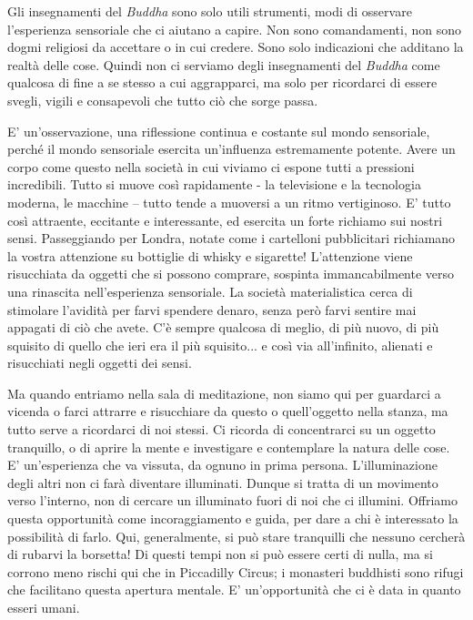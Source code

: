 Gli insegnamenti del \textit{Buddha} sono solo utili strumenti, modi di osservare
l'esperienza sensoriale che ci aiutano a capire. Non sono comandamenti,
non sono dogmi religiosi da accettare o in cui credere. Sono solo
indicazioni che additano la realtà delle cose. Quindi non ci serviamo
degli insegnamenti del \textit{Buddha} come qualcosa di fine a se stesso a cui
aggrapparci, ma solo per ricordarci di essere svegli, vigili e
consapevoli che tutto ciò che sorge passa.

E' un'osservazione, una riflessione continua e costante sul mondo
sensoriale, perché il mondo sensoriale esercita un'influenza
estremamente potente. Avere un corpo come questo nella società in cui
viviamo ci espone tutti a pressioni incredibili. Tutto si muove così
rapidamente - la televisione e la tecnologia moderna, le macchine –
tutto tende a muoversi a un ritmo vertiginoso. E' tutto così attraente,
eccitante e interessante, ed esercita un forte richiamo sui nostri
sensi. Passeggiando per Londra, notate come i cartelloni pubblicitari
richiamano la vostra attenzione su bottiglie di whisky e sigarette!
L'attenzione viene risucchiata da oggetti che si possono comprare,
sospinta immancabilmente verso una rinascita nell'esperienza sensoriale.
La società materialistica cerca di stimolare l'avidità per farvi
spendere denaro, senza però farvi sentire mai appagati di ciò che avete.
C'è sempre qualcosa di meglio, di più nuovo, di più squisito di quello
che ieri era il più squisito... e così via all'infinito, alienati e
risucchiati negli oggetti dei sensi.

Ma quando entriamo nella sala di meditazione, non siamo qui per
guardarci a vicenda o farci attrarre e risucchiare da questo o
quell'oggetto nella stanza, ma tutto serve a ricordarci di noi stessi.
Ci ricorda di concentrarci su un oggetto tranquillo, o di aprire la
mente e investigare e contemplare la natura delle cose. E' un'esperienza
che va vissuta, da ognuno in prima persona. L'illuminazione degli altri
non ci farà diventare illuminati. Dunque si tratta di un movimento verso
l'interno, non di cercare un illuminato fuori di noi che ci illumini.
Offriamo questa opportunità come incoraggiamento e guida, per dare a chi
è interessato la possibilità di farlo. Qui, generalmente, si può stare
tranquilli che nessuno cercherà di rubarvi la borsetta! Di questi tempi
non si può essere certi di nulla, ma si corrono meno rischi qui che in
Piccadilly Circus; i monasteri buddhisti sono rifugi che facilitano
questa apertura mentale. E' un'opportunità che ci è data in quanto
esseri umani.

